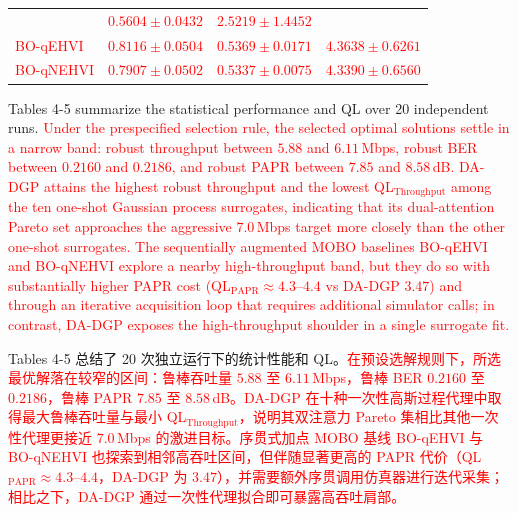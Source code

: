 \documentclass[11pt]{article}
\begin{document}
\begin{table}[!htbp]
\begin{tabular*}{\textwidth}{@{\extracolsep{\fill}}lccc}
		                                                        & \textcolor{red}{$0.5604 \pm 0.0432$}%
		                                                        & \textcolor{red}{$2.5219 \pm 1.4452$}\\%
		\textcolor{red}{BO-qEHVI}%
		                                                        & \textcolor{red}{$0.8116 \pm 0.0504$}%
		                                                        & \textcolor{red}{$0.5369 \pm 0.0171$}%
		                                                        & \textcolor{red}{$4.3638 \pm 0.6261$}\\%
		\textcolor{red}{BO-qNEHVI}%
		                                                        & \textcolor{red}{$0.7907 \pm 0.0502$}%
		                                                        & \textcolor{red}{$0.5337 \pm 0.0075$}%
		                                                        & \textcolor{red}{$4.3390 \pm 0.6560$}\\%
		\bottomrule
	\end{tabular*}
\end{table}


Tables 4-5 summarize the statistical performance and QL over 20 independent runs. \textcolor{red}{Under the prespecified selection rule, the selected optimal solutions settle in a narrow band: robust throughput between $5.88$ and $6.11$\,Mbps, robust BER between $0.2160$ and $0.2186$, and robust PAPR between $7.85$ and $8.58$\,dB. DA-DGP attains the highest robust throughput and the lowest QL$_{\text{Throughput}}$ among the ten one-shot Gaussian process surrogates, indicating that its dual-attention Pareto set approaches the aggressive $7.0$\,Mbps target more closely than the other one-shot surrogates. The sequentially augmented MOBO baselines BO-qEHVI and BO-qNEHVI explore a nearby high-throughput band, but they do so with substantially higher PAPR cost (QL$_{\text{PAPR}}\!\approx\!4.3$--$4.4$ vs DA-DGP $3.47$) and through an iterative acquisition loop that requires additional simulator calls; in contrast, DA-DGP exposes the high-throughput shoulder in a single surrogate fit.}%

Tables 4-5 总结了 20 次独立运行下的统计性能和 QL。\textcolor{red}{在预设选解规则下，所选最优解落在较窄的区间：鲁棒吞吐量 $5.88$ 至 $6.11$\,Mbps，鲁棒 BER $0.2160$ 至 $0.2186$，鲁棒 PAPR $7.85$ 至 $8.58$\,dB。DA-DGP 在十种一次性高斯过程代理中取得最大鲁棒吞吐量与最小 QL$_{\text{Throughput}}$，说明其双注意力 Pareto 集相比其他一次性代理更接近 $7.0$\,Mbps 的激进目标。序贯式加点 MOBO 基线 BO-qEHVI 与 BO-qNEHVI 也探索到相邻高吞吐区间，但伴随显著更高的 PAPR 代价（QL$_{\text{PAPR}}\!\approx\!4.3$--$4.4$，DA-DGP 为 $3.47$），并需要额外序贯调用仿真器进行迭代采集；相比之下，DA-DGP 通过一次性代理拟合即可暴露高吞吐肩部。}%
\end{document}
